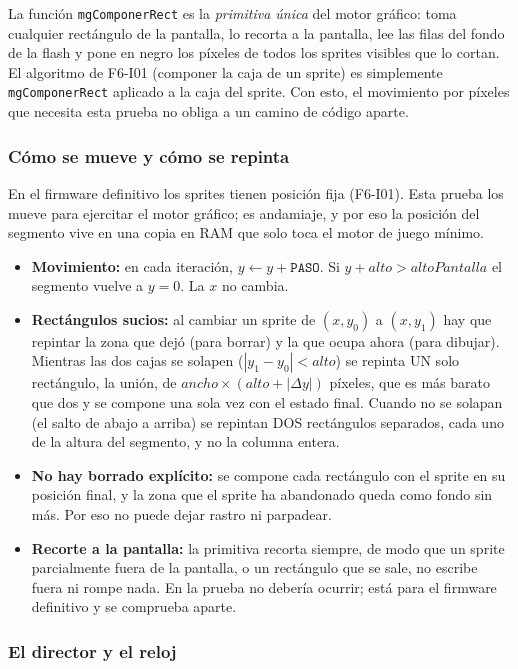La función \texttt{mgComponerRect} es la \emph{primitiva única} del motor gráfico: toma cualquier rectángulo de la pantalla, lo recorta a la pantalla, lee las filas del fondo de la flash y pone en negro los píxeles de todos los sprites visibles que lo cortan. El algoritmo de F6-I01 (componer la caja de un sprite) es simplemente \texttt{mgComponerRect} aplicado a la caja del sprite. Con esto, el movimiento por píxeles que necesita esta prueba no obliga a un camino de código aparte.

\subsubsection{Cómo se mueve y cómo se repinta}

En el firmware definitivo los sprites tienen posición fija (F6-I01). Esta prueba los mueve para ejercitar el motor gráfico; es andamiaje, y por eso la posición del segmento vive en una copia en RAM que solo toca el motor de juego mínimo.

\begin{itemize}
	\item \textbf{Movimiento:} en cada iteración, $y \leftarrow y + \texttt{PASO}$. Si $y + alto > altoPantalla$ el segmento vuelve a $y = 0$. La $x$ no cambia.
	\item \textbf{Rectángulos sucios:} al cambiar un sprite de $(x, y_0)$ a $(x, y_1)$ hay que repintar la zona que dejó (para borrar) y la que ocupa ahora (para dibujar). Mientras las dos cajas se solapen ($|y_1 - y_0| < alto$) se repinta UN solo rectángulo, la unión, de $ancho \times (alto + |\Delta y|)$ píxeles, que es más barato que dos y se compone una sola vez con el estado final. Cuando no se solapan (el salto de abajo a arriba) se repintan DOS rectángulos separados, cada uno de la altura del segmento, y no la columna entera.
	\item \textbf{No hay borrado explícito:} se compone cada rectángulo con el sprite en su posición final, y la zona que el sprite ha abandonado queda como fondo sin más. Por eso no puede dejar rastro ni parpadear.
	\item \textbf{Recorte a la pantalla:} la primitiva recorta siempre, de modo que un sprite parcialmente fuera de la pantalla, o un rectángulo que se sale, no escribe fuera ni rompe nada. En la prueba no debería ocurrir; está para el firmware definitivo y se comprueba aparte.
\end{itemize}

\subsubsection{El director y el reloj}

